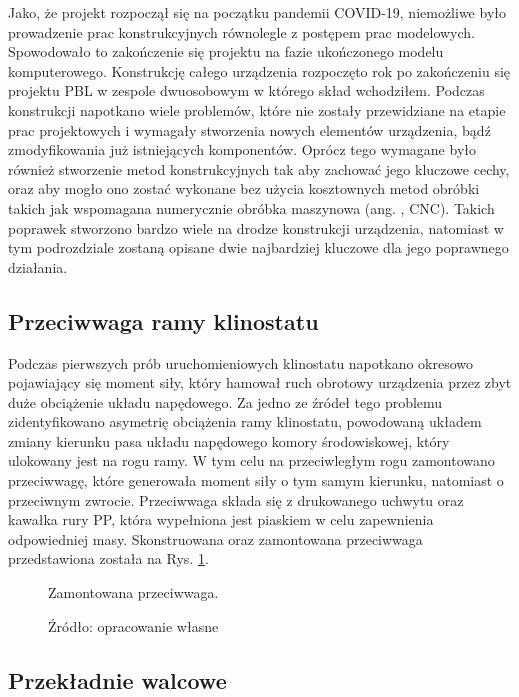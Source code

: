 Jako, że projekt rozpoczął się na początku pandemii COVID-19, niemożliwe było prowadzenie prac
 konstrukcyjnych równolegle z postępem prac modelowych. Spowodowało to zakończenie się projektu
  na fazie ukończonego modelu komputerowego. Konstrukcję całego urządzenia rozpoczęto rok po
   zakończeniu się projektu PBL w zespole dwuosobowym w którego skład wchodziłem. Podczas
    konstrukcji napotkano wiele problemów, które nie zostały przewidziane na etapie prac
     projektowych i wymagały stworzenia nowych elementów urządzenia, bądź zmodyfikowania już
      istniejących komponentów. Oprócz tego wymagane było również stworzenie metod
       konstrukcyjnych tak aby zachować jego kluczowe cechy, oraz aby mogło ono zostać wykonane
        bez użycia kosztownych metod obróbki takich jak wspomagana numerycznie obróbka maszynowa
         (ang. , CNC). Takich poprawek stworzono bardzo
          wiele na drodze konstrukcji urządzenia, natomiast w tym podrozdziale zostaną opisane
           dwie najbardziej kluczowe dla jego poprawnego działania.
           

\subsection{Przeciwwaga ramy klinostatu}

Podczas pierwszych prób uruchomieniowych klinostatu napotkano okresowo pojawiający się moment
 siły, który hamował ruch obrotowy urządzenia przez zbyt duże obciążenie układu napędowego. Za
  jedno ze źródeł tego problemu zidentyfikowano asymetrię obciążenia ramy klinostatu, powodowaną
   układem zmiany kierunku pasa układu napędowego komory środowiskowej, który ulokowany jest na
    rogu ramy. W tym celu na przeciwległym rogu zamontowano przeciwwagę, które generowała moment
     siły o tym samym kierunku, natomiast o przeciwnym zwrocie. Przeciwwaga składa się z
      drukowanego uchwytu oraz kawałka rury PP, która wypełniona jest piaskiem w celu
       zapewnienia odpowiedniej masy. Skonstruowana oraz zamontowana przeciwwaga przedstawiona
        została na Rys. \ref{fig:przeciwwaga}.

\begin{figure}[ht]
	\centering
	\setlength{\fboxsep}{0pt}
	\setlength{\fboxrule}{1pt}
	\caption{Zamontowana przeciwwaga.} 
	\caption*{Źródło: opracowanie własne}
	\label{fig:przeciwwaga}
\end{figure}

\subsection{Przekładnie walcowe}

